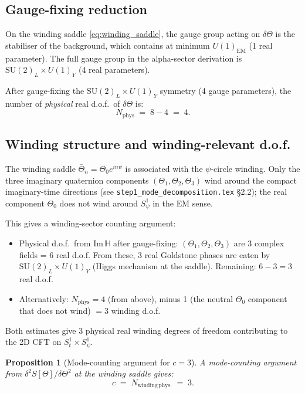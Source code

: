 \documentclass[12pt,a4paper]{article}
\newtheorem{proposition}[theorem]{Proposition}
\theoremstyle{remark}
\newcommand{\HH}{\mathbb{H}}
\begin{document}
\subsection{Gauge-fixing reduction}

On the winding saddle \eqref{eq:winding_saddle}, the gauge group acting on
$\delta\Theta$ is the stabiliser of the background, which contains at minimum
$U(1)_{\mathrm{EM}}$ (1 real parameter).  The full gauge group in the
alpha-sector derivation is $\mathrm{SU}(2)_L \times U(1)_Y$ (4 real parameters).

After gauge-fixing the $\mathrm{SU}(2)_L\times U(1)_Y$ symmetry (4 gauge
parameters), the number of \emph{physical} real d.o.f.\ of $\delta\Theta$ is:
\begin{equation}
  N_{\mathrm{phys}} \;=\; 8 - 4 \;=\; 4.
  \label{eq:N_phys}
\end{equation}

\subsection{Winding structure and winding-relevant d.o.f.}

The winding saddle $\bar\Theta_n = \Theta_0 e^{in\psi}$ is associated with
the $\psi$-circle winding.  Only the three imaginary quaternion components
$(\Theta_1, \Theta_2, \Theta_3)$ wind around the compact imaginary-time
directions (see \texttt{step1\_mode\_decomposition.tex} §2.2); the real
component $\Theta_0$ does not wind around $S^1_\psi$ in the EM sense.

This gives a winding-sector counting argument:

\begin{itemize}
  \item Physical d.o.f.\ from $\mathrm{Im}\,\HH$ after gauge-fixing:
    $(\Theta_1, \Theta_2, \Theta_3)$ are 3 complex fields = 6 real d.o.f.
    From these, 3 real Goldstone phases are eaten by
    $\mathrm{SU}(2)_L\times U(1)_Y$ (Higgs mechanism at the saddle).
    Remaining: $6 - 3 = 3$ real d.o.f.

  \item Alternatively: $N_{\mathrm{phys}} = 4$ (from above), minus 1 (the
    neutral $\Theta_0$ component that does not wind) $= 3$ winding d.o.f.
\end{itemize}

Both estimates give 3 physical real winding degrees of freedom contributing
to the 2D CFT on $S^1_t\times S^1_\psi$.

\begin{proposition}[Mode-counting argument for $c = 3$]
\label{prop:c3}
A mode-counting argument from $\delta^2S[\Theta]/\delta\Theta^2$ at the
winding saddle gives:
\begin{equation}
  c \;=\; N_{\mathrm{winding\,phys.}} \;=\; 3.
  \label{eq:c_3}
\end{equation}
\end{proposition}
\end{document}
